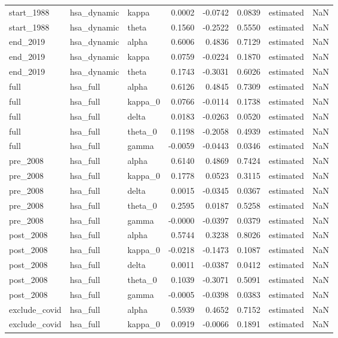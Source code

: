 \begin{tabular}{lllrrrlr}
start\_1988 & hsa\_dynamic & kappa & 0.0002 & -0.0742 & 0.0839 & estimated & NaN \\
start\_1988 & hsa\_dynamic & theta & 0.1560 & -0.2522 & 0.5550 & estimated & NaN \\
end\_2019 & hsa\_dynamic & alpha & 0.6006 & 0.4836 & 0.7129 & estimated & NaN \\
end\_2019 & hsa\_dynamic & kappa & 0.0759 & -0.0224 & 0.1870 & estimated & NaN \\
end\_2019 & hsa\_dynamic & theta & 0.1743 & -0.3031 & 0.6026 & estimated & NaN \\
full & hsa\_full & alpha & 0.6126 & 0.4845 & 0.7309 & estimated & NaN \\
full & hsa\_full & kappa\_0 & 0.0766 & -0.0114 & 0.1738 & estimated & NaN \\
full & hsa\_full & delta & 0.0183 & -0.0263 & 0.0520 & estimated & NaN \\
full & hsa\_full & theta\_0 & 0.1198 & -0.2058 & 0.4939 & estimated & NaN \\
full & hsa\_full & gamma & -0.0059 & -0.0443 & 0.0346 & estimated & NaN \\
pre\_2008 & hsa\_full & alpha & 0.6140 & 0.4869 & 0.7424 & estimated & NaN \\
pre\_2008 & hsa\_full & kappa\_0 & 0.1778 & 0.0523 & 0.3115 & estimated & NaN \\
pre\_2008 & hsa\_full & delta & 0.0015 & -0.0345 & 0.0367 & estimated & NaN \\
pre\_2008 & hsa\_full & theta\_0 & 0.2595 & 0.0187 & 0.5258 & estimated & NaN \\
pre\_2008 & hsa\_full & gamma & -0.0000 & -0.0397 & 0.0379 & estimated & NaN \\
post\_2008 & hsa\_full & alpha & 0.5744 & 0.3238 & 0.8026 & estimated & NaN \\
post\_2008 & hsa\_full & kappa\_0 & -0.0218 & -0.1473 & 0.1087 & estimated & NaN \\
post\_2008 & hsa\_full & delta & 0.0011 & -0.0387 & 0.0412 & estimated & NaN \\
post\_2008 & hsa\_full & theta\_0 & 0.1039 & -0.3071 & 0.5091 & estimated & NaN \\
post\_2008 & hsa\_full & gamma & -0.0005 & -0.0398 & 0.0383 & estimated & NaN \\
exclude\_covid & hsa\_full & alpha & 0.5939 & 0.4652 & 0.7152 & estimated & NaN \\
exclude\_covid & hsa\_full & kappa\_0 & 0.0919 & -0.0066 & 0.1891 & estimated & NaN \\

\end{tabular}

